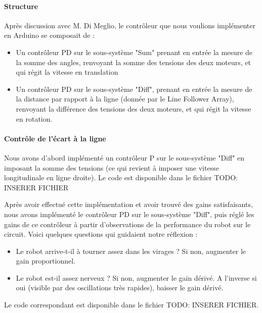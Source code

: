 \documentclass{report}
\begin{document}
\paragraph{Structure}

Après discussion avec M. Di Meglio, le contrôleur que nous voulions implémenter en Arduino se composait de :
\begin{itemize}
\item Un contrôleur PD sur le sous-système "Sum" prenant en entrée la mesure de la somme des angles, renvoyant la somme des tensions des deux moteurs, et qui régit la vitesse en translation
\item Un contrôleur PD sur le sous-système "Diff", prenant en entrée la mesure de la distance par rapport à la ligne (donnée par le Line Follower Array), renvoyant la différence des tensions des deux moteurs, et qui régit la vitesse en rotation.
\end{itemize}
\paragraph{Contrôle de l'écart à la ligne} 

Nous avons d'abord implémenté un contrôleur P sur le sous-système "Diff" en imposant la somme des tensions (ce qui revient à imposer une vitesse longitudinale en ligne droite). Le code est disponible dans le fichier TODO: INSERER FICHIER

Après avoir effectué cette implémentation et avoir trouvé des gains satisfaisants, nous avons implémenté le contrôleur PD sur le sous-système "Diff", puis réglé les gains de ce contrôleur à partir d'observations de la performance du robot sur le circuit. Voici quelques questions qui guidaient notre réflexion :
\begin{itemize}
    \item Le robot arrive-t-il à tourner assez dans les virages ? Si non, augmenter le gain proportionnel.
    \item Le robot est-il assez nerveux ? Si non, augmenter le gain dérivé. A l'inverse si oui (visible par des oscillations très rapides), baisser le gain dérivé.
\end{itemize}

Le code correspondant est disponible dans le fichier TODO: INSERER FICHIER.
\end{document}
